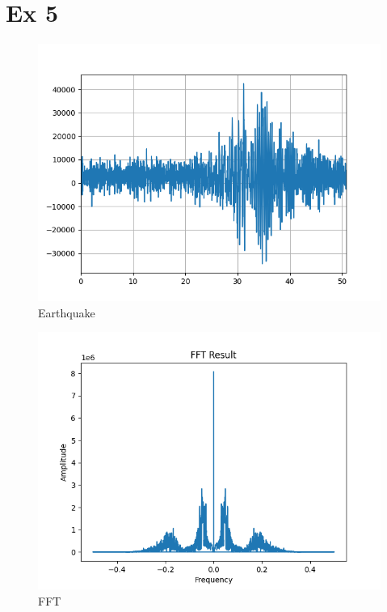 \documentclass{article}
\begin{document}
\section*{Ex 5}
\begin{figure}[H]
    \includegraphics[width=\textwidth]{Ex 5a.1.png}
    \caption{Earthquake}
\end{figure}
\begin{figure}[H]
    \includegraphics[width=\textwidth]{Ex 5a.2.png}
    \caption{FFT}
\end{figure}
\end{document}

